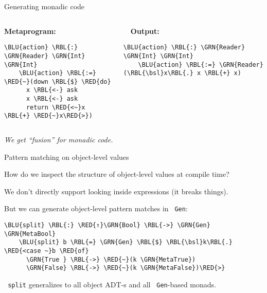 \documentclass[dvipsnames,aspectratio=169]{beamer}
\theoremstyle{remark}
\newcommand{\RED}[1]{{\color{BrickRed} #1}}
\newcommand{\GRN}[1]{{\color{OliveGreen} #1}}
\newcommand{\RBL}[1]{{\color{RoyalBlue} #1}}
\newcommand{\BLU}[1]{{\color{Blue} #1}}
\newcommand{\bsl}{\textbackslash}
\begin{document}
\begin{frame}[fragile]{Generating monadic code}

\begin{columns}
\begin{column}{0.4\textwidth}
\textbf{Metaprogram:}
\begin{Verbatim}[commandchars=\\\{\}]
    \BLU{action} \RBL{:} \GRN{Reader} \GRN{Int} \GRN{Int}
    \BLU{action} \RBL{:=} \RED{~}(down \RBL{$} \RED{do}
      x \RBL{<-} ask
      x \RBL{<-} ask
      return \RED{<~}x \RBL{+} \RED{~}x\RED{>})
\end{Verbatim}
\end{column}

\begin{column}{0.5\textwidth}
\textbf{$\hspace{1em}$Output:}
\begin{Verbatim}[commandchars=\\\{\}]
    \BLU{action} \RBL{:} \GRN{Reader} \GRN{Int} \GRN{Int}
    \BLU{action} \RBL{:=} \GRN{Reader} (\RBL{\bsl}x\RBL{.} x \RBL{+} x)



\end{Verbatim}
\end{column}
\end{columns}
\vspace{2em}

\emph{We get ``fusion'' for monadic code.}

\end{frame}

\begin{frame}[fragile]{Pattern matching on object-level values}

How do we inspect the structure of object-level values at compile time?
\vspace{1em}

We don't directly support looking inside expressions (it breaks things).
\vspace{1em}

But we can generate object-level pattern matches in \texttt{\GRN{Gen}}:
\vspace{0.5em}
\begin{Verbatim}[commandchars=\\\{\}]
    \BLU{split} \RBL{:} \RED{⇑}\GRN{Bool} \RBL{->} \GRN{Gen} \GRN{MetaBool}
    \BLU{split} b \RBL{=} \GRN{Gen} \RBL{$} \RBL{\bsl}k\RBL{.} \RED{<case ~}b \RED{of}
      \GRN{True } \RBL{->} \RED{~}(k \GRN{MetaTrue})
      \GRN{False} \RBL{->} \RED{~}(k \GRN{MetaFalse})\RED{>}
\end{Verbatim}

\vspace{1em}
\texttt{\BLU{split}} generalizes to all object ADT-s and all \texttt{\GRN{Gen}}-based monads.

\end{frame}
\end{document}
